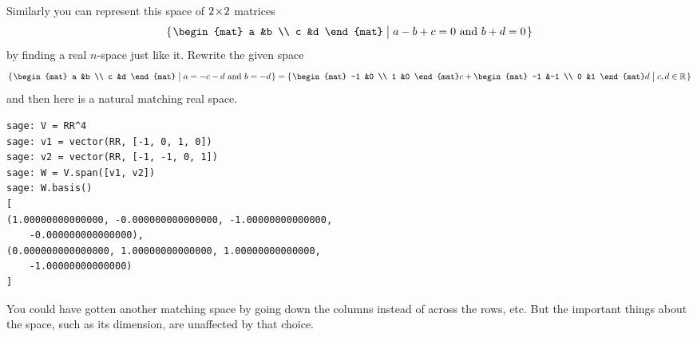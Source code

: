 Similarly you can represent this space of $2 \! \times \! 2$ matrices
\begin{equation*}
  \set{\begin{mat}
         a  &b \\
         c  &d
       \end{mat}\suchthat \text{$a-b+c=0$ and $b+d=0$}}
\end{equation*}
by finding a real $n$-space just like it.
Rewrite the given space
\begin{equation*}
  \set{\begin{mat}
         a  &b \\
         c  &d
       \end{mat}\suchthat \text{$a=-c-d$ and $b=-d$}}
  =\set{\begin{mat}
         -1  &0 \\
          1  &0
       \end{mat}c
       +
       \begin{mat}
         -1  &-1 \\
          0  &1
       \end{mat}d
       \suchthat c,d\in\Re}
\end{equation*}
and then here is a natural matching real space.
\begin{lstlisting}
sage: V = RR^4
sage: v1 = vector(RR, [-1, 0, 1, 0])
sage: v2 = vector(RR, [-1, -1, 0, 1])
sage: W = V.span([v1, v2])
sage: W.basis()
[
(1.00000000000000, -0.000000000000000, -1.00000000000000, 
    -0.000000000000000),
(0.000000000000000, 1.00000000000000, 1.00000000000000, 
    -1.00000000000000)
]  
\end{lstlisting}
You could have gotten another matching space by going down the columns 
instead of across the rows, etc.  
But the important things about the space, such as its dimension, are 
unaffected by that choice.

\endinput


TODO:
